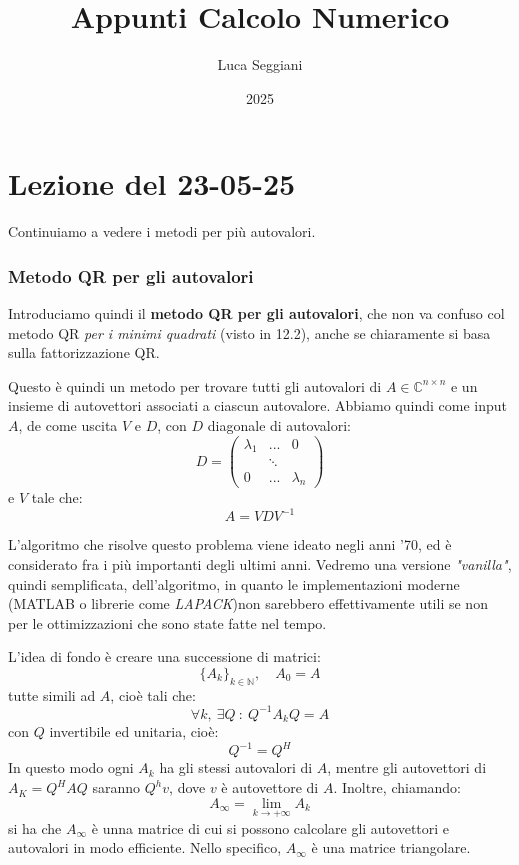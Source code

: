 \documentclass[a4paper,11pt]{article}
\title{Appunti Calcolo Numerico}
\author{Luca Seggiani}
\date{2025}
\begin{document}
\section{Lezione del 23-05-25}
\thispagestyle{empty}
\pagestyle{fancy}

Continuiamo a vedere i metodi per più autovalori.

\subsubsection{Metodo QR per gli autovalori}
Introduciamo quindi il \textbf{metodo QR per gli autovalori}, che non va confuso col metodo QR \textit{per i minimi quadrati} (visto in 12.2), anche se chiaramente si basa sulla fattorizzazione QR.

Questo è quindi un metodo per trovare tutti gli autovalori di $A \in \mathbb{C}^{n \times n}$ e un insieme di autovettori associati a ciascun autovalore.
Abbiamo quindi come input $A$, de come uscita $V$ e $D$, con $D$ diagonale di autovalori:
$$
D =
\begin{pmatrix}
	\lambda_1 & ... & 0 \\
						& \ddots & \\
	0 & ... & \lambda_n
\end{pmatrix}
$$
e $V$ tale che:
$$
A = V D V^{-1}
$$

L'algoritmo che risolve questo problema viene ideato negli anni '70, ed è considerato fra i più importanti degli ultimi anni.
Vedremo una versione \textit{"vanilla"}, quindi semplificata, dell'algoritmo, in quanto le implementazioni moderne (MATLAB o librerie come \textit{LAPACK})non sarebbero effettivamente utili se non per le ottimizzazioni che sono state fatte nel tempo.

L'idea di fondo è creare una successione di matrici:
$$ \{A_k\}_{k \in \mathbb{N}}, \quad A_0 = A$$
tutte simili ad $A$, cioè tali che:
$$
\forall k, \ \exists Q \ : \ Q^{-1} A_k Q = A
$$
con $Q$ invertibile ed unitaria, cioè:
$$
Q^{-1} = Q^H
$$
In questo modo ogni $A_k$ ha gli stessi autovalori di $A$, mentre gli autovettori di $A_K = Q^H A Q$ saranno $Q^h v$, dove $v$ è autovettore di $A$.
Inoltre, chiamando:
$$
A_{\infty} = \lim_{k \rightarrow +\infty} A_k
$$
si ha che $A_{\infty}$ è unna matrice di cui si possono calcolare gli autovettori e autovalori in modo efficiente.
Nello specifico, $A_{\infty}$ è una matrice triangolare.
\end{document}
